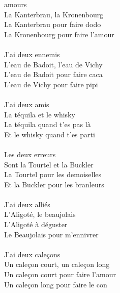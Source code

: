 
 amours
\\La Kanterbrau, la Kronenbourg
\\La Kanterbrau pour faire dodo
\\La Kronenbourg pour faire l'amour
\\\\J'ai deux ennemis
\\L'eau de Badoit, l'eau de Vichy
\\L'eau de Badoit pour faire caca
\\L'eau de Vichy pour faire pipi
\\\\J'ai deux amis
\\La téquila et le whisky
\\La téquila quand t'es pas là
\\Et le whisky quand t'es parti
\\\\Les deux erreurs
\\Sont la Tourtel et la Buckler
\\La Tourtel pour les demoiselles
\\Et la Buckler pour les branleurs
\\\\J'ai deux alliés
\\L'Aligoté, le beaujolais
\\L'Aligoté à déguster
\\Le Beaujolais pour m'ennivrer
\\\\J'ai deux caleçons
\\Un caleçon court, un caleçon long
\\Un caleçon court pour faire l'amour
\\Un caleçon long pour faire le con 
\\\\
\\\\
\breakpage